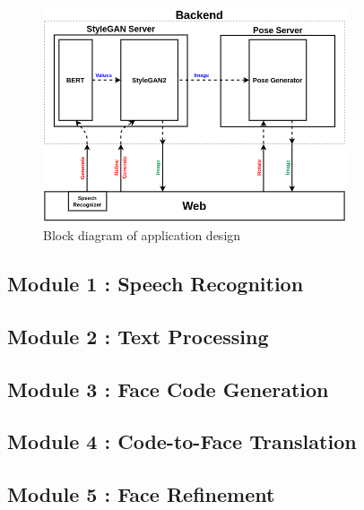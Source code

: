 \begin{figure}[H]
    \centering
    \includegraphics[width=0.8\textwidth]{images/app-design.png}
    \caption{Block diagram of application design}
    \label{fig:app}
\end{figure}

\newpage

\subsection{Module 1 : Speech Recognition}
\label{sec:speech}


\newpage

\subsection{Module 2 : Text Processing}
\label{sec:text}


\newpage

\subsection{Module 3 : Face Code Generation}
\label{sec:code_gen}


\newpage

\subsection{Module 4 : Code-to-Face Translation}
\label{sec:face_gen}


\newpage

\subsection{Module 5 : Face Refinement}
\label{sec:face_ref}


